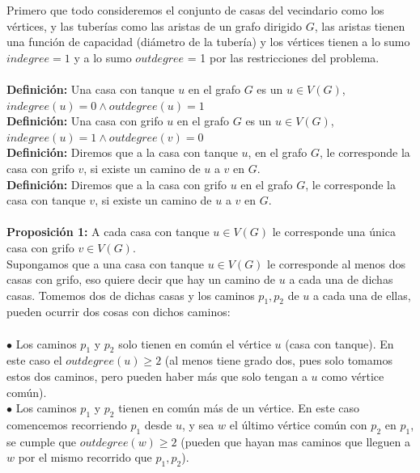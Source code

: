 \documentclass{article}
\begin{document}
    Primero que todo consideremos el conjunto de casas del vecindario como los v\'ertices, y las tuber\'ias como las aristas de un grafo
    dirigido  $G$, las aristas tienen una funci\'on de capacidad (di\'ametro de la tuber\'ia) y los v\'ertices tienen a lo sumo $indegree = 1$
    y a lo sumo $outdegree$ = 1 por las restricciones del problema.\\\\

    \noindent \textbf{Definici\'on:} Una casa con tanque $u$ en el grafo $G$ es un $u \in V(G)$,\\ $indegree(u) = 0 \wedge outdegree(u) = 1$\\

    \noindent \textbf{Definici\'on:} Una casa con grifo $u$ en el grafo $G$ es un $u \in V(G)$,\\ $indegree(u) = 1 \wedge outdegree(v) = 0$\\

    \noindent \textbf{Definici\'on:} Diremos que a la casa con tanque $u$, en el grafo $G$, le corresponde la casa con grifo
     $v$, si existe un camino de $u$ a $v$ en $G$.\\

     \noindent \textbf{Definici\'on:} Diremos que a la casa con grifo $u$ en el 
    grafo $G$, le corresponde la casa con tanque $v$, si existe un camino de $u$ a $v$ en $G$.\\\\

    \noindent \textbf{Proposici\'on 1:} A cada casa con tanque $u \in V(G)$ le corresponde una \'unica casa con grifo $v \in V(G)$.\\

    Supongamos que a una casa con tanque $u \in V(G)$ le corresponde al menos dos casas con grifo, eso quiere decir
    que hay un camino de $u$ a cada una de dichas casas. Tomemos dos de dichas casas y los caminos $p_1, p_2$ de $u$
    a cada una de ellas, pueden ocurrir dos cosas con dichos caminos:\\\\

    $\bullet$ Los caminos $p_1$ y $p_2$ solo tienen en com\'un el v\'ertice $u$ (casa con tanque). En este caso
    el $outdegree(u) \geq 2$ (al menos tiene grado dos, pues solo tomamos estos dos caminos, pero pueden haber m\'as que
    solo tengan a $u$ como v\'ertice com\'un).\\

    $\bullet$ Los caminos $p_1$ y $p_2$ tienen en com\'un m\'as de un v\'ertice. En este caso comencemos recorriendo $p_1$ desde
    $u$, y sea $w$ el \'ultimo v\'ertice com\'un con $p_2$ en $p_1$, se cumple que $outdegree(w) \geq 2$ (pueden que hayan mas caminos
    que lleguen a $w$ por el mismo recorrido que $p_1, p_2$).\\\\
\end{document}
